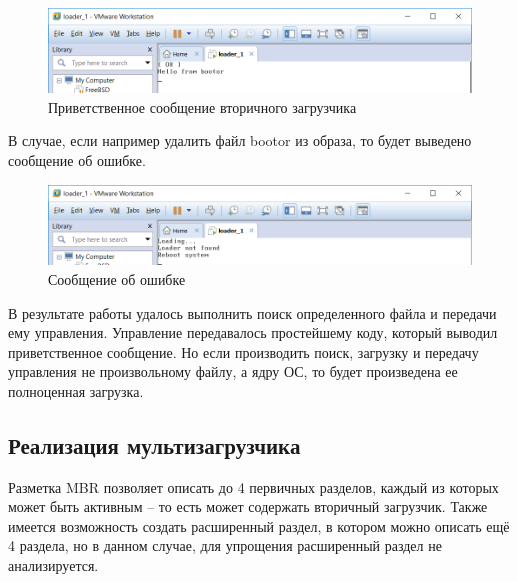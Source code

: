 \begin{figure}[H]
  \centering
  \includegraphics[width=\textwidth]{img/p2/6}
  \caption{Приветственное сообщение вторичного загрузчика}
\end{figure}
В случае, если например удалить файл bootor из образа, то будет выведено сообщение об ошибке.
\begin{figure}[H]
  \centering
  \includegraphics[width=\textwidth]{img/p2/5}
  \caption{Сообщение об ошибке}
\end{figure}
В результате работы удалось выполнить поиск определенного файла и передачи ему управления. Управление передавалось простейшему коду, который выводил приветственное сообщение. Но если производить поиск, загрузку и передачу управления не произвольному файлу, а ядру ОС, то будет произведена ее полноценная загрузка. 


\subsection{Реализация мультизагрузчика}
Разметка MBR позволяет описать до 4 первичных разделов, каждый из которых может быть активным – то есть может содержать вторичный загрузчик. Также имеется возможность создать расширенный раздел, в котором можно описать ещё 4 раздела, но в данном случае, для упрощения расширенный раздел не анализируется.

